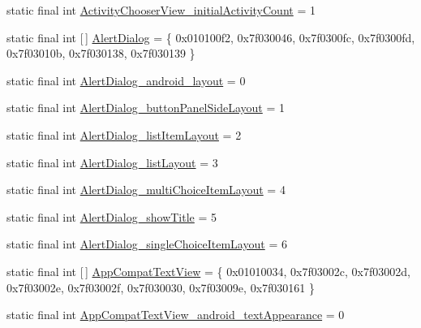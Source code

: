 \begin{DoxyCompactItemize}
\item 
static final int \mbox{\hyperlink{classcom_1_1google_1_1android_1_1gms_1_1R_1_1styleable_a912c336f884497ffaecec915f9936430}{Activity\+Chooser\+View\+\_\+initial\+Activity\+Count}} = 1
\item 
static final int \mbox{[}$\,$\mbox{]} \mbox{\hyperlink{classcom_1_1google_1_1android_1_1gms_1_1R_1_1styleable_a821a4792eda873df99355f2cc3900099}{Alert\+Dialog}} = \{ 0x010100f2, 0x7f030046, 0x7f0300fc, 0x7f0300fd, 0x7f03010b, 0x7f030138, 0x7f030139 \}
\item 
static final int \mbox{\hyperlink{classcom_1_1google_1_1android_1_1gms_1_1R_1_1styleable_ab9813c6567ff9055d065b3e45b54421a}{Alert\+Dialog\+\_\+android\+\_\+layout}} = 0
\item 
static final int \mbox{\hyperlink{classcom_1_1google_1_1android_1_1gms_1_1R_1_1styleable_a8dca982bce4464ad850f90966717f321}{Alert\+Dialog\+\_\+button\+Panel\+Side\+Layout}} = 1
\item 
static final int \mbox{\hyperlink{classcom_1_1google_1_1android_1_1gms_1_1R_1_1styleable_aab56d7d83f911cccad8e8b5373372467}{Alert\+Dialog\+\_\+list\+Item\+Layout}} = 2
\item 
static final int \mbox{\hyperlink{classcom_1_1google_1_1android_1_1gms_1_1R_1_1styleable_a7872a26398070f89dd4e8f74027fbb98}{Alert\+Dialog\+\_\+list\+Layout}} = 3
\item 
static final int \mbox{\hyperlink{classcom_1_1google_1_1android_1_1gms_1_1R_1_1styleable_add894b8ad2a1c99da621a705b4c63350}{Alert\+Dialog\+\_\+multi\+Choice\+Item\+Layout}} = 4
\item 
static final int \mbox{\hyperlink{classcom_1_1google_1_1android_1_1gms_1_1R_1_1styleable_af393435f4aa6e1d6a2223e508f2a99c8}{Alert\+Dialog\+\_\+show\+Title}} = 5
\item 
static final int \mbox{\hyperlink{classcom_1_1google_1_1android_1_1gms_1_1R_1_1styleable_af2752474fe53dc81ddaca2002718f65d}{Alert\+Dialog\+\_\+single\+Choice\+Item\+Layout}} = 6
\item 
static final int \mbox{[}$\,$\mbox{]} \mbox{\hyperlink{classcom_1_1google_1_1android_1_1gms_1_1R_1_1styleable_a0c087b52bc20634efaf5dc5a3a634426}{App\+Compat\+Text\+View}} = \{ 0x01010034, 0x7f03002c, 0x7f03002d, 0x7f03002e, 0x7f03002f, 0x7f030030, 0x7f03009e, 0x7f030161 \}
\item 
static final int \mbox{\hyperlink{classcom_1_1google_1_1android_1_1gms_1_1R_1_1styleable_a5299dda317212fbabbfc09411345dac1}{App\+Compat\+Text\+View\+\_\+android\+\_\+text\+Appearance}} = 0

\end{DoxyCompactItemize}
